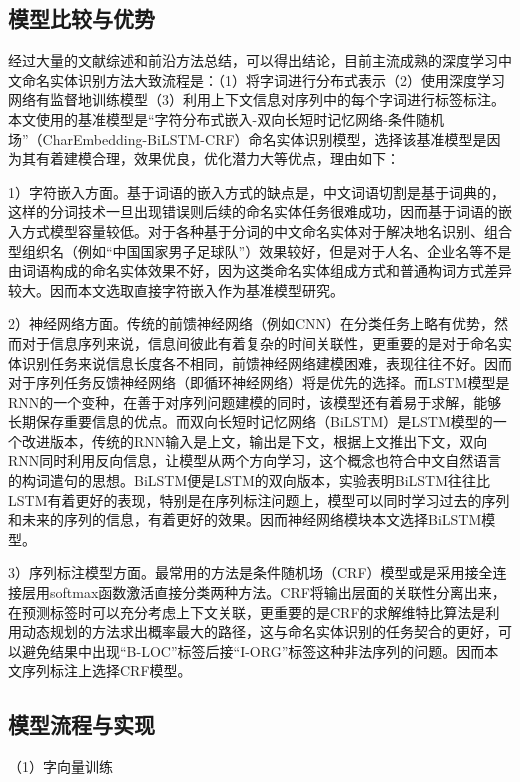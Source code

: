 \documentclass[winfonts,master,oneside,nobackinfo]{njuthesis}
\begin{document}
\subsection{模型比较与优势}
经过大量的文献综述和前沿方法总结，可以得出结论，目前主流成熟的深度学习中文命名实体识别方法大致流程是：（1）将字词进行分布式表示（2）使用深度学习网络有监督地训练模型（3）利用上下文信息对序列中的每个字词进行标签标注。本文使用的基准模型是“字符分布式嵌入-双向长短时记忆网络-条件随机场”（CharEmbedding-BiLSTM-CRF）命名实体识别模型，选择该基准模型是因为其有着建模合理，效果优良，优化潜力大等优点，理由如下：

1）字符嵌入方面。基于词语的嵌入方式的缺点是，中文词语切割是基于词典的，这样的分词技术一旦出现错误则后续的命名实体任务很难成功，因而基于词语的嵌入方式模型容量较低。对于各种基于分词的中文命名实体对于解决地名识别、组合型组织名（例如“中国国家男子足球队”）效果较好，但是对于人名、企业名等不是由词语构成的命名实体效果不好，因为这类命名实体组成方式和普通构词方式差异较大。因而本文选取直接字符嵌入作为基准模型研究。

2）神经网络方面。传统的前馈神经网络（例如CNN）在分类任务上略有优势，然而对于信息序列来说，信息间彼此有着复杂的时间关联性，更重要的是对于命名实体识别任务来说信息长度各不相同，前馈神经网络建模困难，表现往往不好。因而对于序列任务反馈神经网络（即循环神经网络）将是优先的选择。而LSTM模型是RNN的一个变种，在善于对序列问题建模的同时，该模型还有着易于求解，能够长期保存重要信息的优点。而双向长短时记忆网络（BiLSTM）是LSTM模型的一个改进版本，传统的RNN输入是上文，输出是下文，根据上文推出下文，双向RNN同时利用反向信息，让模型从两个方向学习，这个概念也符合中文自然语言的构词遣句的思想。BiLSTM便是LSTM的双向版本，实验表明BiLSTM往往比LSTM有着更好的表现\cite{Graves}，特别是在序列标注问题上，模型可以同时学习过去的序列和未来的序列的信息，有着更好的效果\cite{Huang}。因而神经网络模块本文选择BiLSTM模型。

3）序列标注模型方面。最常用的方法是条件随机场（CRF）模型或是采用接全连接层用softmax函数激活直接分类两种方法。CRF将输出层面的关联性分离出来，在预测标签时可以充分考虑上下文关联，更重要的是CRF的求解维特比算法是利用动态规划的方法求出概率最大的路径，这与命名实体识别的任务契合的更好，可以避免结果中出现“B-LOC”标签后接“I-ORG”标签这种非法序列的问题。因而本文序列标注上选择CRF模型。

\subsection{模型流程与实现}

（1）字向量训练
\end{document}
